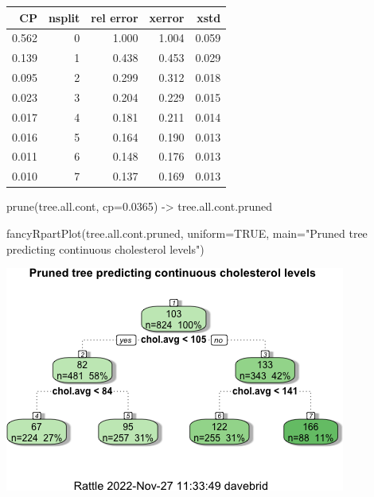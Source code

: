 \documentclass[
]{article}
\newenvironment{Shaded}{\begin{snugshade}}{\end{snugshade}}
\newcommand{\AttributeTok}[1]{\textcolor[rgb]{0.77,0.63,0.00}{#1}}
\newcommand{\CommentTok}[1]{\textcolor[rgb]{0.56,0.35,0.01}{\textit{#1}}}
\newcommand{\ConstantTok}[1]{\textcolor[rgb]{0.00,0.00,0.00}{#1}}
\newcommand{\FloatTok}[1]{\textcolor[rgb]{0.00,0.00,0.81}{#1}}
\newcommand{\FunctionTok}[1]{\textcolor[rgb]{0.00,0.00,0.00}{#1}}
\newcommand{\NormalTok}[1]{#1}
\newcommand{\OtherTok}[1]{\textcolor[rgb]{0.56,0.35,0.01}{#1}}
\newcommand{\SpecialCharTok}[1]{\textcolor[rgb]{0.00,0.00,0.00}{#1}}
\newcommand{\StringTok}[1]{\textcolor[rgb]{0.31,0.60,0.02}{#1}}
\begin{document}
\begin{Shaded}
\end{Shaded}

\begin{longtable}[]{@{}rrrrr@{}}
\toprule()
CP & nsplit & rel error & xerror & xstd \\
\midrule()
\endhead
0.562 & 0 & 1.000 & 1.004 & 0.059 \\
0.139 & 1 & 0.438 & 0.453 & 0.029 \\
0.095 & 2 & 0.299 & 0.312 & 0.018 \\
0.023 & 3 & 0.204 & 0.229 & 0.015 \\
0.017 & 4 & 0.181 & 0.211 & 0.014 \\
0.016 & 5 & 0.164 & 0.190 & 0.013 \\
0.011 & 6 & 0.148 & 0.176 & 0.013 \\
0.010 & 7 & 0.137 & 0.169 & 0.013 \\
\bottomrule()
\end{longtable}

\begin{Shaded}
\begin{Highlighting}[]
\FunctionTok{prune}\NormalTok{(tree.all.cont, }\AttributeTok{cp=}\FloatTok{0.0365}\NormalTok{) }\OtherTok{{-}\textgreater{}}\NormalTok{ tree.all.cont.pruned}

\FunctionTok{fancyRpartPlot}\NormalTok{(tree.all.cont.pruned, }\AttributeTok{uniform=}\ConstantTok{TRUE}\NormalTok{, }\AttributeTok{main=}\StringTok{"Pruned tree predicting continuous cholesterol levels"}\NormalTok{)}
\end{Highlighting}
\end{Shaded}

\includegraphics{figures/full-tree-3.png}
\end{document}
